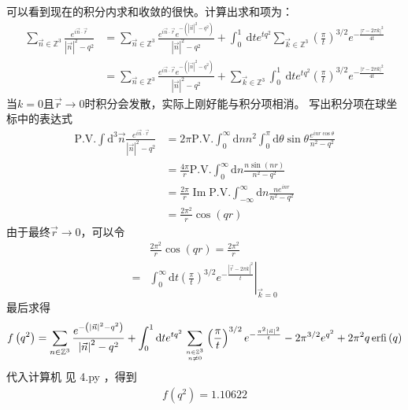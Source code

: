 \documentclass{article}
\numberwithin{equation}{section}
\begin{document}
可以看到现在的积分内求和收敛的很快。计算出求和项为：
\begin{align}
    \sum_{\vec{n} \in \mathbb{Z}^{3}} \frac{e^{i \vec{n} \cdot \vec{r}}}{|\vec{n}|^{2}-q^{2}} & =\sum_{\vec{n} \in \mathbb{Z}^{3}} \frac{e^{i \vec{n} \cdot \vec{r}} e^{-\left(|\vec{n}|^{2}-q^{2}\right)}}{|\vec{n}|^{2}-q^{2}}+\int_{0}^{1} \mathrm{~d} t e^{t q^{2}} \sum_{\vec{k} \in \mathbb{Z}^{3}}\left(\frac{\pi}{t}\right)^{3 / 2} e^{-\frac{|\tau-2 \pi k|^{2}}{4 t}} \\
                                                                                              & =\sum_{\vec{n} \in \mathbb{Z}^{3}} \frac{e^{i \vec{n} \cdot \vec{r}} e^{-\left(|\vec{n}|^{2}-q^{2}\right)}}{|\vec{n}|^{2}-q^{2}}+\sum_{\vec{k} \in \mathbb{Z}^{3}}\int_{0}^{1} \mathrm{~d} t e^{t q^{2}}\left(\frac{\pi}{t}\right)^{3 / 2} e^{-\frac{|\tau-2 \pi k|^{2}}{4 t}}
\end{align}
当$k=0$且$\vec{r}\to 0$时积分会发散，实际上刚好能与积分项相消。
写出积分项在球坐标中的表达式
\begin{align}
    \text{P.V.} \int \mathrm{d}^{3} \vec{n} \frac{e^{i \vec{n} \cdot \vec{r}}}{\left|\vec{n}\right|^{2}-q^{2}} & =2 \pi \text{P.V.} \int_{0}^{\infty} \mathrm{d} n n^{2} \int_{0}^{\pi} \mathrm{d} \theta \sin \theta \frac{e^{i n r \cos \theta}}{n^{2}-q^{2}} \\
                                                                                                               & =\frac{4 \pi}{r} \text{P.V.} \int_{0}^{\infty} \mathrm{d} n  \frac{n\sin (n r)}{n^{2}-q^{2}}                                                   \\
                                                                                                               & =\frac{2 \pi}{r} \operatorname{Im} \text {P.V.} \int_{-\infty}^{\infty} \mathrm{d} n \frac{n e^{i n r}}{n^{2}-q^{2}}                           \\
                                                                                                               & =\frac{2 \pi^{2}}{r}\cos(qr)
\end{align}
由于最终$\vec{r}\to 0$，可以令
\begin{align}
      & \frac{2 \pi^{2}}{r}\cos(qr)=\frac{2 \pi^{2}}{r}                                                                                 \\
    = & \left.\int_0^\infty \mathrm{d}t \left(\frac{\pi}{t}\right)^{3/2}e^{-\frac{\left|\vec{r}-2\pi k\right|^2}{t}}\right|_{\vec{k}=0}
\end{align}
最后求得
\begin{align}
    f\left(q^2\right)=\sum_{n\in\mathbb{Z}^3} \frac{e^{-\left(\left|\vec{n}\right|^2-q^2\right)}}{\left|\vec{n}\right|^2-q^2}+\int_0^1 \mathrm{d}t e^{tq^2}\sum_{n\in\mathbb{Z}^3\atop n\neq0} \left(\frac{\pi}{t}\right)^{3/2}e^{-\frac{\pi^2\left|\vec{n}\right|^2}{t}}-2\pi^{3/2}e^{q^2}+2\pi^2q\, \mathrm{erfi}\left(q\right)
\end{align}
代入计算机 见 4.py ，得到
\begin{align}
    f\left(q^2\right)=1.10622
\end{align}
\end{document}
